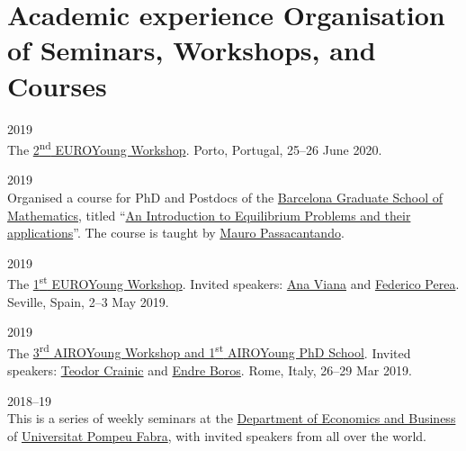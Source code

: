 \section*{Academic experience {\small Organisation of Seminars, Workshops, and Courses}}

\begin{paracol}{2}
  2019
\switchcolumn
  \\
  The \href{https://euroyoung.github.io/workshop20.html}{2\textsuperscript{nd} EUROYoung Workshop}.
  Porto, Portugal, 25--26 June 2020.
\end{paracol}

\begin{paracol}{2}
  2019
\switchcolumn
  \\
  Organised a course for PhD and Postdocs of the \href{https://www.bgsmath.cat/}{Barcelona Graduate School of Mathematics}, titled ``\href{https://web.archive.org/web/20190115064545/https://bgsmath.cat/event/introduction-equilibrium-problems-applications/}{An Introduction to Equilibrium Problems and their applications}''.
  The course is taught by \href{https://scholar.google.com/citations?user=GEtI8UUAAAAJ}{Mauro Passacantando}.
\end{paracol}

\begin{paracol}{2}
  2019
\switchcolumn
  \\
  The \href{https://euroyoung.github.io/workshop19.html}{1\textsuperscript{st} EUROYoung Workshop}.
  Invited speakers: \href{https://scholar.google.it/citations?user=RW7QevYAAAAJ}{Ana Viana} and \href{https://scholar.google.com/citations?user=DzigbIgAAAAJ}{Federico Perea}.
  Seville, Spain, 2--3 May 2019.
\end{paracol}

\begin{paracol}{2}
  2019
\switchcolumn
  \\
  The \href{https://workshop.airoyoung.org/2019}{3\textsuperscript{rd} AIROYoung Workshop and 1\textsuperscript{st} AIROYoung PhD School}.
  Invited speakers: \href{https://scholar.google.it/citations?user=C_zcTIAAAAAJ}{Teodor Crainic} and \href{https://scholar.google.it/citations?user=ok_1EXwAAAAJ}{Endre Boros}.
  Rome, Italy, 26--29 Mar 2019.
\end{paracol}

\begin{paracol}{2}
  2018--19
\switchcolumn
  \\
  This is a series of weekly seminars at the \href{https://www.upf.edu/web/econ/}{Department of Economics and Business} of \href{https://www.upf.edu/}{Universitat Pompeu Fabra}, with invited speakers from all over the world.
\end{paracol}

